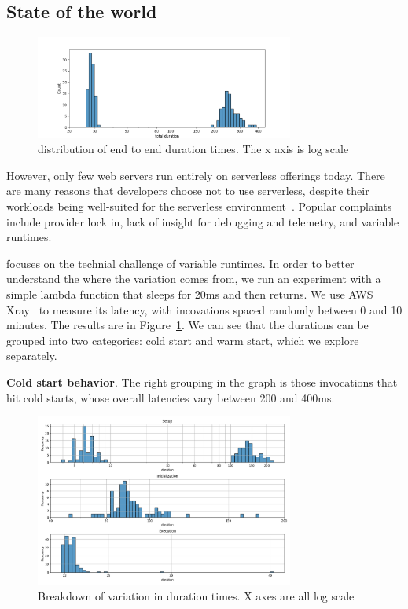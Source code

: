 \subsection{State of the world}


\begin{figure}[t!]
    \centering
      \includegraphics[width=8.5cm]{img/lambda_total_durations.png}
      \caption{ distribution of end to end duration times. The x axis is log scale }
    \label{fig:lambda-total-durations}
\end{figure}

However, only few web servers run entirely on serverless offerings today. There
are many reasons that developers choose not to use serverless, despite their
workloads being well-suited for the serverless
environment~\cite{not-lambda-blog,reddit-serverless2}. Popular complaints
include provider lock in, lack of insight for debugging and telemetry, and
variable runtimes.


\Sys{} focuses on the technial challenge of variable runtimes. In order to
better understand the where the variation comes from, we run an experiment with
a simple lambda function that sleeps for 20ms and then returns. We use AWS
Xray~\cite{aws-xray} to measure its latency, with incovations spaced randomly
between 0 and 10 minutes. The results are in
Figure~\ref{fig:lambda-total-durations}. We can see that the durations can be
grouped into two categories: cold start and warm start, which we explore
separately.

\textbf{Cold start behavior}.
% 
The right grouping in the graph is those invocations that hit cold starts, whose
overall latencies vary between 200 and 400ms.

\begin{figure}[t!]
  \centering
    \includegraphics[width=8.5cm]{img/lambda_duration_breakdown.png}
    \caption{ Breakdown of variation in duration times. X axes are all log scale }
  \label{fig:lambda-durations-breakdown}
\end{figure}


